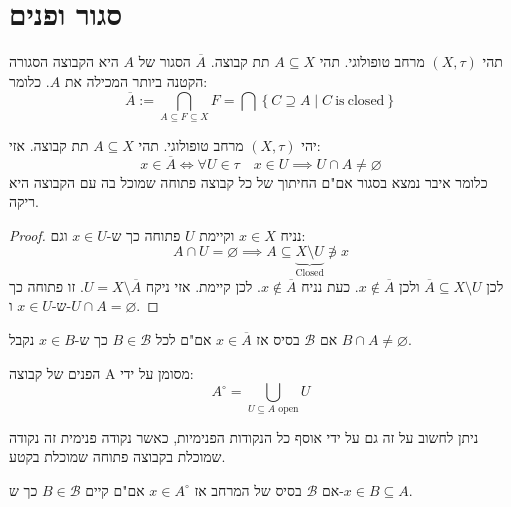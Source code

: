 \documentclass{tstextbook}
\begin{document}
\section{סגור ופנים}

\begin{definition}
תהי \((X,\tau)\) מרחב טופולוגי. תהי \(A\subseteq X\) תת קבוצה. \(\overline{A}\) הסגור של \(A\) היא הקבוצה הסגורה הקטנה ביותר המכילה את \(A\). כלומר:
$$\overline{A} := \bigcap_{A\subseteq F\subseteq X} F=\bigcap\left\{ C\supseteq A\mid C{\mathrm{~is~closed}} \right\}$$

\end{definition}
\begin{proposition}
יהי \((X,\tau)\) מרחב טופולוגי. תהי \(A\subseteq X\) תת קבוצה. אזי:
$$x\in \overline{A} \iff \forall U \in \tau \quad x \in U \implies U\cap  A\neq \varnothing $$
כלומר איבר נמצא בסגור אם"ם החיתוך של כל קבוצה פתוחה שמוכל בה עם הקבוצה היא ריקה.

\end{proposition}
\begin{proof}
נניח \(x \in X\) וקיימת \(U\) פתוחה כך ש-\(x \in U\) וגם:
$$A\cap  U = \varnothing \implies A\subseteq \underbrace{ X \setminus  U }_{ \text{Closed} } \not\ni x$$
לכן \(\overline{A} \subseteq X \setminus U\) ולכן \(x \not\in \overline{ A}\).
כעת נניח \(x \not\in \overline{A}\). לכן קיימת. אזי ניקח \(U= X \setminus \overline{A}\). זו פתוחה כך ש-\(x \in U\) ו-\(U\cap A = \varnothing\).

\end{proof}
\begin{corollary}
אם \(\mathcal{ B}\) בסיס אז \(x \in \overline{A}\) אם"ם לכל \(B \in \mathcal{B}\) כך ש-\(x \in B\) נקבל \(B\cap A \neq \varnothing\).

\end{corollary}
\begin{definition}
הפנים של קבוצה A מסומן על ידי:
$$A^{\circ }=\bigcup_{U\subseteq A \text{ open}}U$$

\end{definition}
\begin{remark}
ניתן לחשוב על זה גם על ידי אוסף כל הנקודות הפנימיות, כאשר נקודה פנימית זה נקודה שמוכלת בקבוצה פתוחה שמוכלת בקטע.

\end{remark}
\begin{proposition}
אם \(\mathcal{B}\) בסיס של המרחב אז \(x \in A^{\circ}\) אם"ם קיים \(B \in \mathcal{B}\) כך ש-\(x \in B\subseteq A\).

\end{proposition}
\end{document}
